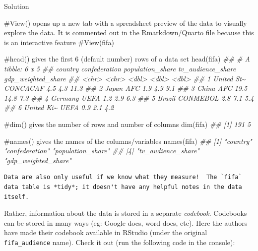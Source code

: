 \documentclass[
  letterpaper,
  DIV=11,
  numbers=noendperiod]{scrreprt}
\newenvironment{Shaded}{\begin{snugshade}}{\end{snugshade}}
\newcommand{\CommentTok}[1]{\textcolor[rgb]{0.37,0.37,0.37}{#1}}
\newcommand{\DocumentationTok}[1]{\textcolor[rgb]{0.37,0.37,0.37}{\textit{#1}}}
\newcommand{\FunctionTok}[1]{\textcolor[rgb]{0.28,0.35,0.67}{#1}}
\newcommand{\NormalTok}[1]{\textcolor[rgb]{0.00,0.23,0.31}{#1}}
\begin{document}
Solution

\begin{Shaded}
\begin{Highlighting}[]
\CommentTok{\#View() opens up a new tab with a spreadsheet preview of the data to visually explore the data. It is commented out in the Rmarkdown/Quarto file because this is an interactive feature}
\CommentTok{\#View(fifa)  }

\CommentTok{\#head() gives the first 6 (default number) rows of a data set}
\FunctionTok{head}\NormalTok{(fifa)  }
\DocumentationTok{\#\# \# A tibble: 6 x 5}
\DocumentationTok{\#\#   country    confederation population\_share tv\_audience\_share gdp\_weighted\_share}
\DocumentationTok{\#\#   \textless{}chr\textgreater{}      \textless{}chr\textgreater{}                    \textless{}dbl\textgreater{}             \textless{}dbl\textgreater{}              \textless{}dbl\textgreater{}}
\DocumentationTok{\#\# 1 United St\textasciitilde{} CONCACAF                   4.5               4.3               11.3}
\DocumentationTok{\#\# 2 Japan      AFC                        1.9               4.9                9.1}
\DocumentationTok{\#\# 3 China      AFC                       19.5              14.8                7.3}
\DocumentationTok{\#\# 4 Germany    UEFA                       1.2               2.9                6.3}
\DocumentationTok{\#\# 5 Brazil     CONMEBOL                   2.8               7.1                5.4}
\DocumentationTok{\#\# 6 United Ki\textasciitilde{} UEFA                       0.9               2.1                4.2}

\CommentTok{\#dim() gives the number of rows and number of columns}
\FunctionTok{dim}\NormalTok{(fifa)           }
\DocumentationTok{\#\# [1] 191   5}

\CommentTok{\#names() gives the names of the columns/variables}
\FunctionTok{names}\NormalTok{(fifa)   }
\DocumentationTok{\#\# [1] "country"            "confederation"      "population\_share"  }
\DocumentationTok{\#\# [4] "tv\_audience\_share"  "gdp\_weighted\_share"}
\end{Highlighting}
\end{Shaded}

\begin{verbatim}
Data are also only useful if we know what they measure!  The `fifa` data table is *tidy*; it doesn't have any helpful notes in the data itself.
\end{verbatim}

Rather, information about the data is stored in a separate
\emph{codebook}. Codebooks can be stored in many ways (eg: Google docs,
word docs, etc). Here the authors have made their codebook available in
RStudio (under the original \texttt{fifa\_audience} name). Check it out
(run the following code in the console):
\end{document}
